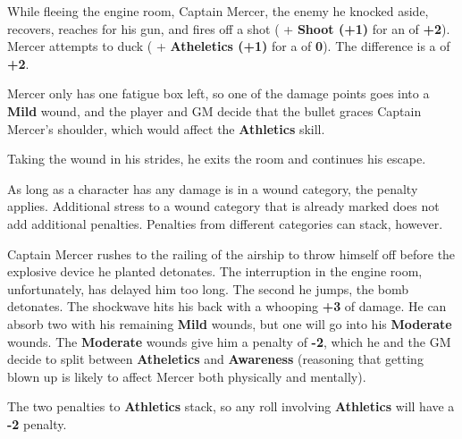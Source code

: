 \begin{multicols}{2}
\begin{Example}
	While fleeing the engine room, Captain Mercer, the enemy he knocked aside, recovers, reaches for his gun, and fires off a shot ( + \textbf{Shoot (+1)} for an \Attack of \textbf{+2}). Mercer attempts to duck ( + \textbf{Atheletics (+1)} for a \Defend of \textbf{0}). The difference is a \Damage of \textbf{+2}.
	
	Mercer only has one fatigue box left, so one of the damage points goes into a \textbf{Mild} wound, and the player and GM decide that the bullet graces Captain Mercer's shoulder, which would affect the \textbf{Athletics} skill.
	
	\vspace{0.5\baselineskip}
	\DamageBox[fatigue=4,mild=1,mildtext=\textbf{Athletics (-1)}]

	Taking the wound in his strides, he exits the room and continues his escape.
\end{Example}

As long as a character has any damage is in a wound category, the penalty applies. Additional stress to a wound category that is already marked does not add additional penalties. Penalties from different categories can stack, however.

\begin{Example}
	Captain Mercer rushes to the railing of the airship to throw himself off before the explosive device he planted detonates. The interruption in the engine room, unfortunately, has delayed him too long. The second he jumps, the bomb detonates. The shockwave hits his back with a whooping \textbf{+3} of damage. He can absorb two with his remaining \textbf{Mild} wounds, but one will go into his \textbf{Moderate} wounds. The \textbf{Moderate} wounds give him a penalty of \textbf{-2}, which he and the GM decide to split between \textbf{Atheletics} and \textbf{Awareness} (reasoning that getting blown up is likely to affect Mercer both physically and mentally).
	
	\vspace{0.5\baselineskip}
	\DamageBox[%
		fatigue=4,%
		mild=3,%
		mildtext=\textbf{Athletics (-1)},%
		moderate=1,%
		moderatetext=\textbf{Athletics (-1), Awareness (-1)}%
	]
	
	\noindent
	The two penalties to \textbf{Athletics} stack, so any roll involving \textbf{Athletics} will have a \textbf{-2} penalty.
\end{Example}


\end{multicols}
